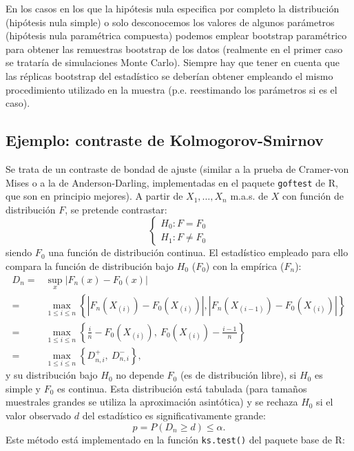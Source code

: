 \documentclass[]{book}
\theoremstyle{break}
\theoremstyle{definition}
\theoremstyle{definition}
\theoremstyle{definition}
\theoremstyle{remark}
\begin{document}
En los casos en los que la hipótesis nula especifica por completo la
distribución (hipótesis nula simple) o solo desconocemos los valores de
algunos parámetros (hipótesis nula paramétrica compuesta) podemos
emplear bootstrap paramétrico para obtener las remuestras bootstrap de
los datos (realmente en el primer caso se trataría de simulaciones Monte
Carlo). Siempre hay que tener en cuenta que las réplicas bootstrap del
estadístico se deberían obtener empleando el mismo procedimiento
utilizado en la muestra (p.e. reestimando los parámetros si es el caso).

\subsection{Ejemplo: contraste de
Kolmogorov-Smirnov}\label{ejemplo-contraste-de-kolmogorov-smirnov}

Se trata de un contraste de bondad de ajuste (similar a la prueba de
Cramer-von Mises o a la de Anderson-Darling, implementadas en el paquete
\texttt{goftest} de R, que son en principio mejores). A partir de
\(X_1,\ldots ,X_n\) m.a.s. de \(X\) con función de distribución \(F\),
se pretende contrastar: \[\left \{ 
\begin{array}{l}
H_0 : F = F_0 \\ 
H_1 : F \neq F_0 
\end{array}
\right. \] siendo \(F_0\) una función de distribución continua. El
estadístico empleado para ello compara la función de distribución bajo
\(H_0\) (\(F_0\)) con la empírica (\(F_n\)): \[\begin{aligned}
    D_n=&\sup_{x}|F_n(x)-F_0(x)| \\
    =&\max_{1 \leq i\leq n}\left \{
    |F_n(X_{(i)})-F_0(X_{(i)})|,|F_n(X_{(i-1)})-F_0(X_{(i)})|\right \} \\
    =&\max_{1 \leq i\leq n}\left \{ \frac{i}{n}-F_0(X_{(i)}), \ F_0(X_{(i)})-\frac{i-1}{n}\right \} \\
    =&\max_{1 \leq i\leq n}\left \{ D_{n,i}^{+},\ D_{n,i}^{-}\right \},
\end{aligned}\] y su distribución bajo \(H_0\) no depende \(F_0\) (es de
distribución libre), si \(H_0\) es simple y \(F_0\) es continua. Esta
distribución está tabulada (para tamaños muestrales grandes se utiliza
la aproximación asintótica) y se rechaza \(H_0\) si el valor observado
\(d\) del estadístico es significativamente grande:
\[p = P \left( D_n \geq d \right) \leq \alpha.\] Este método está
implementado en la función \texttt{ks.test()} del paquete base de R:
\end{document}
